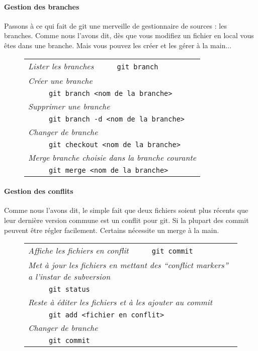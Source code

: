 \paragraph{Gestion des branches} Passons à ce qui fait de git une merveille de gestionnaire de sources : les branches. Comme nous l'avons dit, dès que vous modifiez un fichier en local vous êtes dans une branche. Mais vous pouvez les créer et les gérer à la main...

\begin{figure}[H]
      \begin{tabular}{l}
	\textit{Lister les branches}
	\verb|     git branch|\\
	\textit{Créer une branche}\\
	\verb|     git branch <nom de la branche>|\\
	\textit{Supprimer une branche}\\
	\verb|     git branch -d <nom de la branche>|\\
\textit{Changer de branche}\\
	\verb|     git checkout <nom de la branche>|\\
\textit{Merge branche choisie dans la branche courante}\\
\verb|     git merge <nom de la branche>|\\
     \end{tabular}
\end{figure}

\paragraph{Gestion des conflits} Comme nous l'avons dit, le simple fait que deux fichiers soient plus récents que leur dernière version commune est un conflit pour git. Si la plupart des commit peuvent être régler facilement. Certains nécessite un merge à la main.

\begin{figure}[H]
      \begin{tabular}{l}
	\textit{Affiche les fichiers en conflit}
	\verb|     git commit|\\
	\textit{Met à jour les fichiers en mettant des ``conflict markers'' a l'instar de subversion}\\
	\verb|     git status|\\
	\textit{Reste à éditer les fichiers et à les ajouter au commit}\\
	\verb|     git add <fichier en conflit>|\\
	\textit{Changer de branche}\\
	\verb|     git commit|\\
     \end{tabular}
\end{figure}

